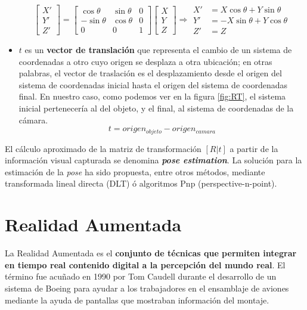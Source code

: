 \begin{itemize}
  \begin{equation}
    \begin{bmatrix}
      X'\\ 
      Y'\\ 
      Z'
    \end{bmatrix}
    =
    \begin{bmatrix}
      \cos\theta  & \sin\theta & 0 \\ 
      -\sin\theta & \cos\theta & 0 \\ 
      0           & 0          & 1
    \end{bmatrix}
    \begin{bmatrix}
      X\\ 
      Y\\ 
      Z
    \end{bmatrix}
    \Rightarrow 
    \begin{aligned}
      X'&= X\cos\theta + Y \sin\theta \\ 
      Y'&=-X\sin\theta + Y \cos\theta \\ 
      Z'&= Z
    \end{aligned}
  \end{equation}

\item $t$ es un \textbf{vector de translación} que representa el cambio de un sistema de coordenadas a otro cuyo origen se desplaza a otra ubicación; en otras palabras, el vector de traslación es el desplazamiento desde el origen del sistema de coordenadas inicial hasta el origen del sistema de coordenadas final. En nuestro caso, como podemos ver en la figura \ref{fig:RT}, el sistema inicial pertenecería al del objeto, y el final, al sistema de coordenadas de la cámara. 
  \begin{equation}
    t = origen_{objeto} - origen_{camara}
  \end{equation}
\end{itemize}

El cálculo aproximado de la matriz de transformación $[R|t]$ a partir de la información visual capturada se denomina \textbf{\textit{pose estimation}}. La solución para la estimación de la \textit{pose} ha sido propuesta, entre otros métodos, mediante transformada lineal directa (DLT) ó algoritmos Pnp (perspective-n-point).

\section{Realidad Aumentada}
La Realidad Aumentada es el \textbf{conjunto de técnicas que permiten integrar en tiempo real contenido digital a la percepción del mundo real}. El término fue acuñado en 1990 por Tom Caudell durante el desarrollo de un sistema de Boeing para ayudar a los trabajadores en el ensamblaje de aviones mediante la ayuda de pantallas que mostraban información del montaje. 

